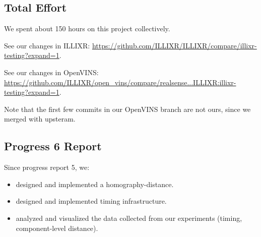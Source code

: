 \documentclass[screen,sigconf,nonacm]{acmart}
\begin{document}
\subsection{Total Effort}

We spent about 150 hours on this project collectively.

See our changes in ILLIXR:
\url{https://github.com/ILLIXR/ILLIXR/compare/illixr-testing?expand=1}.

See our changes in OpenVINS:
\url{https://github.com/ILLIXR/open\_vins/compare/realsense...ILLIXR:illixr-testing?expand=1}.

Note that the first few commits in our OpenVINS branch are not ours, since we merged with upsteram.

\subsection{Progress 6 Report}

Since progress report 5, we:

\begin{itemize}
\item designed and implemented a homography-distance.
\item designed and implemented timing infrastructure.
\item analyzed and visualized the data collected from our experiments (timing, component-level distance).
\end{itemize}


\end{document}
